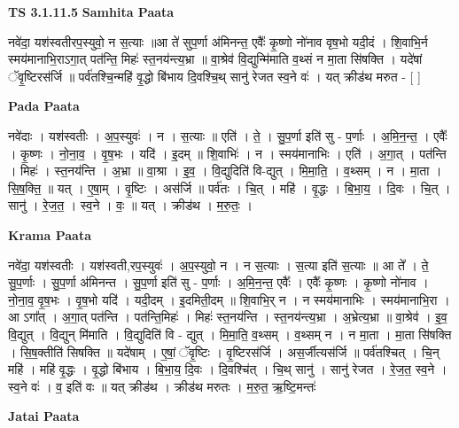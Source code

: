 \documentclass[17pt]{extarticle}
\begin{document}
\textbf{TS 3.1.11.5 } \newline
\textbf{Samhita Paata} \newline

नवे॑दा॒ यश॑स्वतीरप॒स्युवो॒ न स॒त्याः ॥आ ते॑ सुप॒र्णा अ॑मिनन्त॒ एवैः᳚ कृ॒ष्णो नो॑नाव वृष॒भो यदी॒दं । शि॒वाभि॒र्न स्मय॑मानाभि॒राऽगा॒त् पत॑न्ति॒ मिहः॑ स्त॒नय॑न्त्य॒भ्रा ॥ वा॒श्रेव॑ वि॒द्युन्मि॑माति व॒थ्सं न मा॒ता सि॑षक्ति । यदे॑षां ॅवृ॒ष्टिरस॑र्जि ॥ पर्व॑तश्चि॒न्महि॑ वृ॒द्धो बि॑भाय दि॒वश्चि॒थ् सानु॑ रेजत स्व॒ने वः॑ । यत् क्रीड॑थ मरुत - [  ] \newline

\textbf{Pada Paata} \newline

नवे॑दाः । यश॑स्वतीः । अ॒प॒स्युवः॑ । न । स॒त्याः ॥ एति॑ । ते॒ । सु॒प॒र्णा इति॑ सु - प॒र्णाः । अ॒मि॒न॒न्त॒ । एवैः᳚ । कृ॒ष्णः । नो॒ना॒व॒ । वृ॒ष॒भः । यदि॑ । इ॒दम् ॥ शि॒वाभिः॑ । न । स्मय॑मानाभिः । एति॑ । अ॒गा॒त् । पत॑न्ति । मिहः॑ । स्त॒नय॑न्ति । अ॒भ्रा ॥ वा॒श्रा । इ॒व॒ । वि॒द्युदिति॑ वि-द्युत् । मि॒मा॒ति॒ । व॒थ्सम् । न । मा॒ता । सि॒ष॒क्ति॒ ॥ यत् । ए॒षा॒म् । वृ॒ष्टिः । अस॑र्जि ॥ पर्व॑तः । चि॒त् । महि॑ । वृ॒द्धः । बि॒भा॒य॒ । दि॒वः । चि॒त् । सानु॑ । रे॒ज॒त॒ । स्व॒ने । वः॒ ॥ यत् । क्रीड॑थ । म॒रु॒तः॒ ।  \newline


\textbf{Krama Paata} \newline

नवे॑दा॒ यश॑स्वतीः । यश॑स्वती,रप॒स्युवः॑ । अ॒प॒स्युवो॒ न । न स॒त्याः । स॒त्या इति॑ स॒त्याः ॥ आ ते᳚ । ते॒ सु॒प॒र्णाः । सु॒प॒र्णा अ॑मिनन्त । सु॒प॒र्णा इति॑ सु - प॒र्णाः । अ॒मि॒न॒न्त॒ एवैः᳚ । एवैः᳚ कृ॒ष्णः । कृ॒ष्णो नो॑नाव । नो॒ना॒व॒ वृ॒ष॒भः । वृ॒ष॒भो यदि॑ । यदी॒दम् । इ॒दमिती॒दम् ॥ शि॒वाभि॒र् न । न स्मय॑मानाभिः । स्मय॑मानाभि॒रा । आ ऽगा᳚त् । अ॒गा॒त् पत॑न्ति । पत॑न्ति॒मिहः॑ । मिहः॑ स्त॒नय॑न्ति । स्त॒नय॑न्त्य॒भ्रा । अ॒भ्रेत्य॒भ्रा ॥ वा॒श्रेव॑ । इ॒व॒ वि॒द्युत् । वि॒द्युन् मि॑माति । वि॒द्युदिति॑ वि - द्युत् । मि॒मा॒ति॒ व॒थ्सम् । व॒थ्सम् न । न मा॒ता । मा॒ता सि॑षक्ति । सि॒ष॒क्तीति॑ सिषक्ति ॥ यदे॑षाम् । ए॒षां॒ ॅवृ॒ष्टिः । वृ॒ष्टिरस॑र्जि । अस॒र्जीत्यस॑र्जि ॥ पर्व॑तश्चित् । चि॒न् महि॑ । महि॑ वृ॒द्धः । वृ॒द्धो बि॑भाय । बि॒भा॒य॒ दि॒वः । दि॒वश्चि॑त् । चि॒थ् सानु॑ । सानु॑ रेजत । रे॒ज॒त॒ स्व॒ने । स्व॒ने वः॑ । व॒ इति॑ वः ॥ यत् क्रीड॑थ । क्रीड॑थ मरुतः । म॒रु॒त॒ ऋ॒ष्टि॒मन्तः॑ \newline

\textbf{Jatai Paata} \newline
\end{document}
